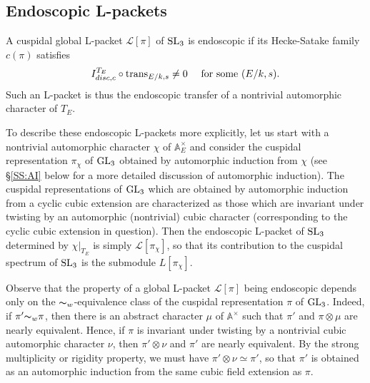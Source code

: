 \documentclass[11pt]{amsart}
\theoremstyle{plain}
\numberwithin{equation}{section}
\newcommand{\A}{\mathbb A}
\def\SL{{\rm SL}}
\def\GL{{\rm GL}}
\def\A{{\mathbb A}}
\begin{document}
\vskip 5pt


 
\subsection{\bf Endoscopic L-packets}
A cuspidal global L-packet $\mathcal{L}[\pi]$ of $\SL_3$ is endoscopic if its Hecke-Satake family $c(\pi)$ satisfies
\[  I_{disc,c}^{T_E} \circ  {\rm trans}_{E/k,s} \ne 0 \quad \text{ for some $(E/k, s)$.} \]
Such an  L-packet is thus the endoscopic transfer of a nontrivial automorphic character of $T_E$. 
\vskip 5pt

To describe these endoscopic L-packets more explicitly, let us start with a nontrivial automorphic  character 
$\chi$ of $\A_E^{\times}$ and consider   the cuspidal representation $\pi_{\chi}$ of $\GL_3$ obtained by automorphic induction from $\chi$ (see \S \ref{SS:AI} below for a more detailed discussion of automorphic induction).  The cuspidal representations of $\GL_3$ which are obtained by automorphic induction from a cyclic cubic extension are characterized as those which are invariant under twisting by an automorphic (nontrivial) cubic character (corresponding to the cyclic cubic extension in question). 
Then the endoscopic L-packet of $\SL_3$ determined by $\chi|_{T_E}$ is simply $\mathcal{L}[\pi_{\chi}]$, so that its contribution to the cuspidal spectrum of $\SL_3$ is the submodule $L[\pi_{\chi}]$. 
\vskip 5pt

 
 Observe that the property of a global L-packet $\mathcal{L}[\pi]$ being endoscopic depends only on the ${\thicksim}_{w}$-equivalence class of the cuspidal representation $\pi$ of $\GL_3$. Indeed, if $\pi' {\thicksim}_w \pi$, 
 then there is an abstract character $\mu$ of $\A^{\times}$ such that $\pi'$ and $\pi \otimes \mu$ are nearly equivalent. Hence, if $\pi$ is invariant under twisting by a nontrivial cubic automorphic character $\nu$, then $\pi' \otimes \nu$ and $\pi'$ are nearly equivalent. 
 By the strong multiplicity or rigidity property, we must have $\pi' \otimes \nu \simeq \pi'$, so that $\pi'$ is obtained as an automorphic induction from the same cubic field extension as $\pi$.   
 \vskip 5pt
 
\end{document}
